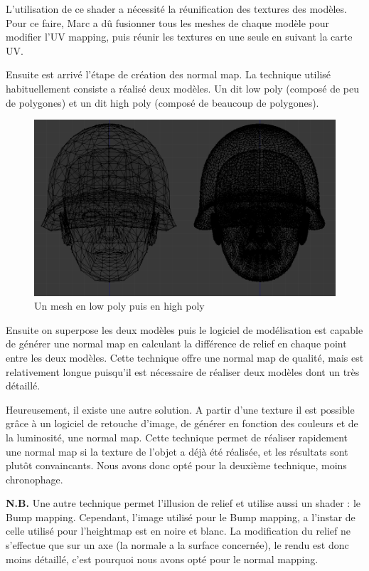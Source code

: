 \documentclass[11pt]{report}
\begin{document}
L’utilisation de ce shader a nécessité la réunification des textures des modèles.
Pour ce faire, Marc a dû fusionner tous les meshes de chaque modèle pour modifier l’UV mapping, puis réunir les textures en une seule en suivant la carte UV.

Ensuite est arrivé l’étape de création des normal map. La technique utilisé habituellement consiste a réalisé deux modèles. Un dit low poly (composé de peu de polygones) et un dit high poly (composé de beaucoup de polygones).

\begin{figure}[htbp]
\centering
\includegraphics[scale=0.22]{lowpoly_vs_highpoly.png}
\caption{Un mesh en low poly puis en high poly}
\end{figure}

Ensuite on superpose les deux modèles puis le logiciel de modélisation est capable de générer une normal map en calculant la différence de relief en chaque point entre les deux modèles.
Cette technique offre une normal map de qualité, mais est relativement longue puisqu'il est nécessaire de réaliser deux modèles dont un très détaillé.

Heureusement, il existe une autre solution. A partir d'une texture il est possible grâce à un logiciel de retouche d'image, de générer en fonction des couleurs et de la luminosité, une normal map.
Cette technique permet de réaliser rapidement une normal map si la texture de l'objet a déjà été réalisée, et les résultats sont plutôt convaincants. Nous avons donc opté pour la deuxième technique, moins chronophage.

\noindent\textbf{N.B.} Une autre technique permet l'illusion de relief et utilise aussi un shader : le Bump mapping. Cependant, l’image utilisé pour le Bump mapping, a l’instar de celle utilisé pour l'heightmap est en noire et blanc. La modification du relief ne s’effectue que sur un axe (la normale a la surface concernée), le rendu est donc moins détaillé, c'est pourquoi nous avons opté pour le normal mapping.
\end{document}

